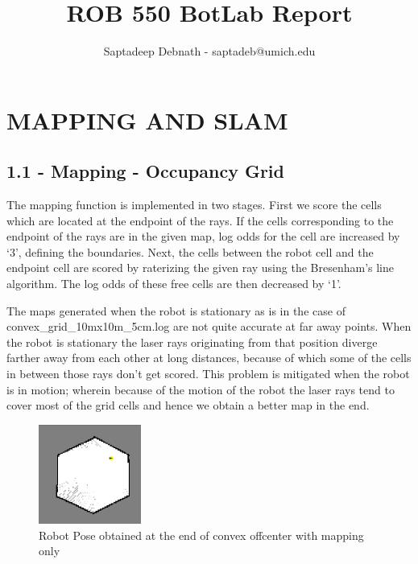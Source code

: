 \documentclass[journal,onecolumn]{IEEEtran}
\begin{document}
\title{%
  ROB 550 BotLab Report \\
  }
    
\author{Saptadeep Debnath - saptadeb@umich.edu}

\maketitle

\IEEEpeerreviewmaketitle

\section{MAPPING AND SLAM}

\subsection*{1.1 - Mapping - Occupancy Grid} 

The mapping function is implemented in two stages. First we score the cells which are located at the endpoint of the rays. If the cells corresponding to the endpoint of the rays are in the given map, log odds for the cell are increased by `3', defining the boundaries. Next, the cells between the robot cell and the endpoint cell are scored by raterizing the given ray using the Bresenham's line algorithm. The log odds of these free cells are then decreased by `1'. 

The maps generated when the robot is stationary as is in the case of convex\_grid\_10mx10m\_5cm.log are not quite accurate at far away points. When the robot is stationary the laser rays originating from that position diverge farther away from each other at long distances, because of which some of the cells in between those rays don't get scored. This problem is mitigated when the robot is in motion; wherein because of the motion of the robot the laser rays tend to cover most of the grid cells and hence we obtain a better map in the end.  

\begin{figure}[H]
\centering
\includegraphics[width=0.3\textwidth]{Media/111.png}
\caption{Robot Pose obtained at the end of convex offcenter with mapping only}
\end{figure}
\end{document}
